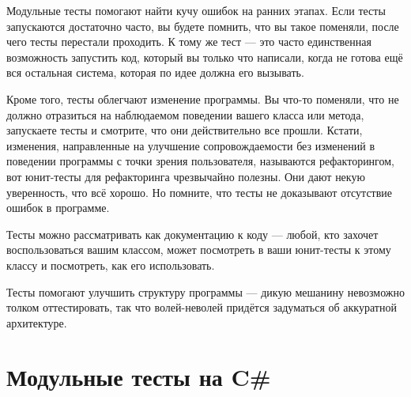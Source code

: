 \documentclass{../../text-style}
\begin{document}
Модульные тесты помогают найти кучу ошибок на ранних этапах. Если тесты запускаются достаточно часто, вы будете помнить, что вы такое поменяли, после чего тесты перестали проходить. К тому же тест --- это часто единственная возможность запустить код, который вы только что написали, когда не готова ещё вся остальная система, которая по идее должна его вызывать.

Кроме того, тесты облегчают изменение программы. Вы что-то поменяли, что не должно отразиться на наблюдаемом поведении вашего класса или метода, запускаете тесты и смотрите, что они действительно все прошли. Кстати, изменения, направленные на улучшение сопровождаемости без изменений в поведении программы с точки зрения пользователя, называются рефакторингом, вот юнит-тесты для рефакторинга чрезвычайно полезны. Они дают некую уверенность, что всё хорошо. Но помните, что тесты не доказывают отсутствие ошибок в программе.

Тесты можно рассматривать как документацию к коду --- любой, кто захочет воспользоваться вашим классом, может посмотреть в ваши юнит-тесты к этому классу и посмотреть, как его использовать.

Тесты помогают улучшить структуру программы --- дикую мешанину невозможно толком оттестировать, так что волей-неволей придётся задуматься об аккуратной архитектуре.

\section{Модульные тесты на C\#}
\end{document}
